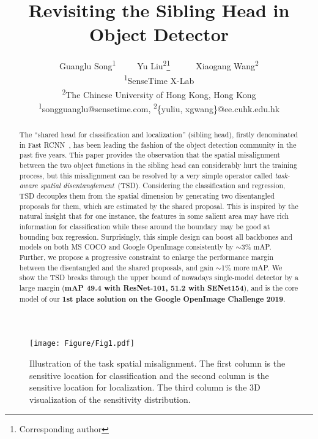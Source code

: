 \documentclass[10pt,twocolumn,letterpaper]{article}
\def \algfullname{\emph{task-aware spatial disentanglement}}
\def \algname{TSD}
\begin{document}
\title{Revisiting the Sibling Head in Object Detector}

\author{Guanglu Song\textsuperscript{\rm 1}\ \ \ \ \  Yu Liu\textsuperscript{\rm 2}\thanks{Corresponding author}\ \ \ \ \ \  Xiaogang Wang\textsuperscript{\rm 2} \\
\textsuperscript{\rm 1}SenseTime X-Lab\\
\textsuperscript{\rm 2}The Chinese University of Hong Kong, Hong Kong\\
\textsuperscript{\rm 1}songguanglu@sensetime.com, \textsuperscript{\rm 2}\{yuliu, xgwang\}@ee.cuhk.edu.hk
}

\maketitle


\begin{abstract}
   The ``shared head for classification and localization'' (sibling head), firstly denominated in Fast RCNN~\cite{girshick2015fast}, has been leading the fashion of the object detection community in the past five years. 
This paper provides the observation that the spatial misalignment between the two object functions in the sibling head can considerably hurt the training process, but this misalignment can be resolved by a very simple operator called \algfullname{}~(\algname{}). Considering the classification and regression, \algname{} decouples them from the spatial dimension by generating two disentangled proposals for them, which are estimated by the shared proposal. This is inspired by the natural insight that for one instance, the features in some salient area may have rich information for classification while these around the boundary may be good at bounding box regression. Surprisingly, this simple design can boost all backbones and models on both MS COCO and Google OpenImage consistently by $\sim$3\% mAP. Further, we propose a progressive constraint to enlarge the performance margin between the disentangled and the shared proposals, and gain $\sim$1\% more mAP. We show the \algname{} breaks through the upper bound of nowadays single-model detector by a large margin (\textbf{mAP 49.4 with ResNet-101, 51.2 with SENet154}), and is the core model of our \textbf{1st place solution on the Google OpenImage Challenge 2019}.

   
   
\end{abstract}

\begin{figure}[t]
\centering
\texttt{[image: Figure/Fig1.pdf]}
   \caption{Illustration of the task spatial misalignment. The first column is the sensitive location for classification and the second column is the sensitive location for localization. The third column is the 3D visualization of the sensitivity distribution.}
\label{fig:moti}
\end{figure}
\end{document}
